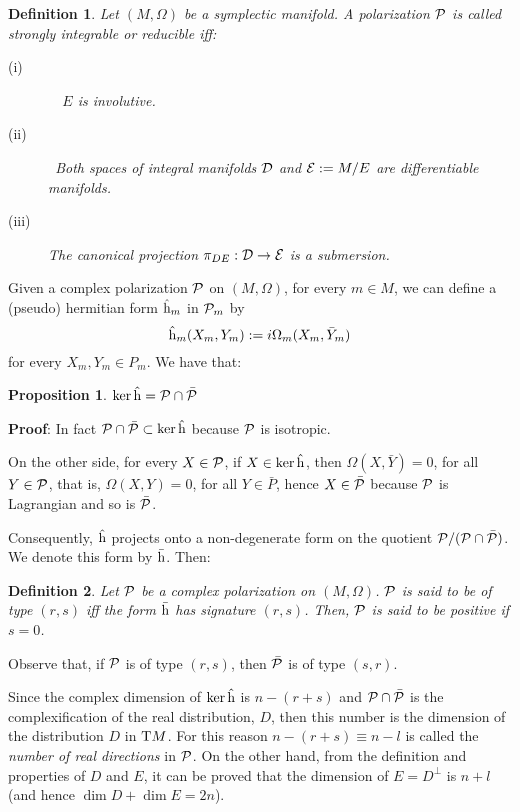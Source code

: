 \documentclass[12pt]{article}
\newtheorem{prop}{Proposition}
\newtheorem{definition}{Definition}
\def\beq{\begin{equation}}
\def\eeq{\end{equation}}
\def\qed{\ifvmode\removelastskip\fi
{\unskip\nobreak\hfil\penalty50\hbox{}\nobreak\hfil
\hbox{\vrule height1.2ex width1.2ex}\parfillskip=0pt
\finalhyphendemerits=0 \par\smallskip}}
\def\P{{\cal P}}
\def\D{{\cal D}}
\def\E{{\cal E}}
\def\h{{\rm h}}
\def\Tan{{\rm T}}
\begin{document}
\begin{definition}
Let $(M,\Omega )$ be a symplectic manifold.
A polarization ${\cal P}$ is called
{\rm strongly integrable} or {\rm reducible} iff:
\begin{description}
\item[{\rm (i)}]\ \
$E$ is involutive.
\item[{\rm (ii)}]\
Both spaces of integral manifolds
$\D$ and $\E := M/E$
are differentiable manifolds.
\item[{\rm (iii)}]
The canonical projection
$\pi_{DE} : \D \to \E$
is a submersion.
\end{description}
\label{sap}
\end{definition}

Given a complex polarization $\P$ on $(M,\Omega )$,
for every $m \in M$, we can define
a (pseudo) hermitian form $\hat \h_m$ in $\P_m$ by
\beq
\hat \h_m(X_m, Y_m) := i\Omega_m(X_m,\bar Y_m)
\label{hermm}
\eeq
for every $X_m,Y_m \in P_m$.
We have that:

\begin{prop}
$\ker \hat \h = \P \cap \bar \P$
\end{prop}
{\bf Proof}: 
In fact $\P \cap \bar\P \subset \ker \hat \h$ because $\P$ is isotropic.

On the other side, for every $X \in \P$, if $X \in \ker \hat \h$, then
$\Omega (X,\bar Y)=0$, for all $Y \in \P$,
that is, $\Omega (X,Y)=0$, for all $Y \in \bar P$,
hence $X \in \bar \P$ because $\P$ is Lagrangian
and so is $\bar \P$.
\qed

Consequently, $\hat \h$ projects onto a non-degenerate form
on the quotient $\P /(\P \cap \bar \P )$.
We denote this form by $\bar \h$. Then:

\begin{definition}
Let $\P$ be a complex polarization on $(M,\Omega )$.
$\P$ is said to be
{\rm of type $(r,s)$} iff
the form $\bar \h$ has signature $(r,s)$.
Then, $\P$ is said to be
{\rm positive} if $s=0$.
\label{typrs}
\end{definition}
Observe that, if $\P$ is of type $(r,s)$,
then $\bar \P$ is of type $(s,r)$.

Since the complex dimension of $\ker \hat \h$ is $n-(r+s)$
and $\P \cap \bar \P$ is the complexification of the real distribution,
$D$, then this number is the dimension of the distribution $D$ in $\Tan
M$.
For this reason $n-(r+s) \equiv n-l$ is called the
{\it number of real directions} in $\P$.
On the other hand, from the definition and properties
of $D$ and $E$, it can be proved that the dimension of $E=D^{\perp}$
is $n+l$ (and hence  $\dim D + \dim E = 2n$).
\end{document}

